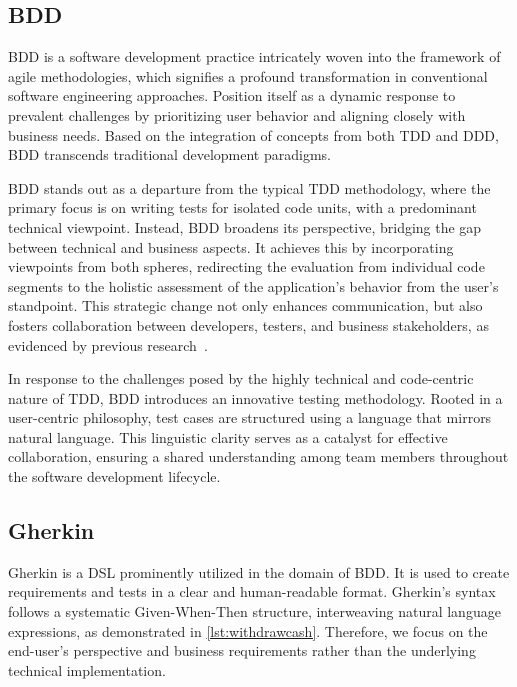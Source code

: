 \subsection{\acl{BDD}}
\label{subsec:bdd}
\acf{BDD} is a software development practice intricately woven into the framework of agile methodologies, which signifies a profound transformation in conventional software engineering approaches. Position itself as a dynamic response to prevalent challenges by prioritizing user behavior and aligning closely with business needs. Based on the integration of concepts from both \ac{TDD} and \ac{DDD}, \ac{BDD} transcends traditional development paradigms.

\ac{BDD} stands out as a departure from the typical \ac{TDD} methodology, where the primary focus is on writing tests for isolated code units, with a predominant technical viewpoint. Instead, \ac{BDD} broadens its perspective, bridging the gap between technical and business aspects. It achieves this by incorporating viewpoints from both spheres, redirecting the evaluation from individual code segments to the holistic assessment of the application's behavior from the user's standpoint. This strategic change not only enhances communication, but also fosters collaboration between developers, testers, and business stakeholders, as evidenced by previous research~\cite{smart2023bdd,pereira2018behavior}.

In response to the challenges posed by the highly technical and code-centric nature of \ac{TDD}, \ac{BDD} introduces an innovative testing methodology. Rooted in a user-centric philosophy, test cases are structured using a language that mirrors natural language. This linguistic clarity serves as a catalyst for effective collaboration, ensuring a shared understanding among team members throughout the software development lifecycle.

\subsection{Gherkin}
\label{subsec:gherkin}

Gherkin is a \ac{DSL} prominently utilized in the domain of \ac{BDD}. It is used to create requirements and tests in a clear and human-readable format. Gherkin's syntax follows a systematic Given-When-Then structure, interweaving natural language expressions, as demonstrated in \cref{lst:withdrawcash}. Therefore, we focus on the end-user's perspective and business requirements rather than the underlying technical implementation.


